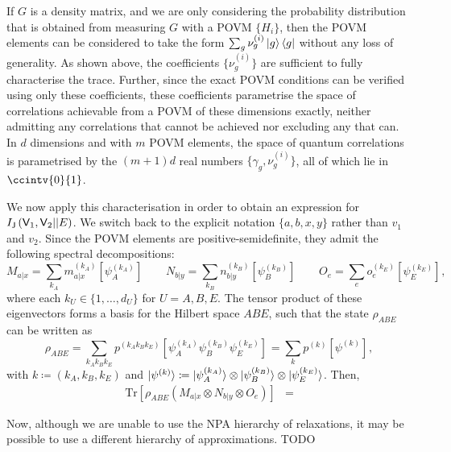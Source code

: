 \documentclass[10pt, a4paper]{article}
\numberwithin{equation}{section} %
\theoremstyle{definition}
\theoremstyle{plain}
\newcommand{\dintv}[2]{\mathopen\{#1,\ldots,#2\mathclose\}}
\newcommand{\?}{\mathrel{?}} %
\newcommand{\Tr}{\mathrm{Tr}} %
\newcommand{\crv}[1]{\mathsf{#1}}
\newcommand{\proj}[2][]{{[#2]}_{#1}}
\begin{document}
    If \(G\) is a density matrix, and we are only considering the probability distribution that is obtained from measuring \(G\) with a POVM \(\{H_i\}\), then the POVM elements can be considered to take the form \(\sum_g \nu_g^{(i)} \ket{g}\bra{g} \) without any loss of generality. As shown above, the coefficients \(\{\nu_g^{(i)}\}\) are sufficient to fully characterise the trace. Further, since the exact POVM conditions can be verified using only these coefficients, these coefficients parametrise the space of correlations achievable from a POVM of these dimensions exactly, neither admitting any correlations that cannot be achieved nor excluding any that can. In \(d\) dimensions and with \(m\) POVM elements, the space of quantum correlations is parametrised by the \((m+1)d\) real numbers \(\{\gamma_g, \nu^{(i)}_g\}\), all of which lie in \(\ccintv{0}{1}\).

    We now apply this characterisation in order to obtain an expression for \(\splitkey{\crv{V}_1, \crv{V}_2}{E}\). We switch back to the explicit notation \(\{a, b, x, y\}\) rather than \(v_1\) and \(v_2\). Since the POVM elements are positive-semidefinite, they admit the following spectral decompositions:
    \begin{equation}
      M_{a|x} = \sum_{k_A} m_{a|x}^{(k_A)} \proj{\psi_A^{(k_A)}} \qquad N_{b|y} = \sum_{k_B} n_{b|y}^{(k_B)} \proj{\psi_B^{(k_B)}} \qquad O_{e} = \sum_{e} o_{e}^{(k_E)} \proj{\psi_E^{(k_E)}},
    \end{equation}
    where each \(k_U \in \dintv{1}{d_U}\) for \(U = A,B,E\). 
    The tensor product of these eigenvectors forms a basis for the Hilbert space \(ABE\), such that the state \(\rho_{ABE}\) can be written as
    \begin{equation}
      \rho_{ABE} = \sum_{k_A k_B k_E} p^{(k_A k_B k_E)} \proj{\psi_A^{(k_A)} \psi_B^{(k_B)} \psi_E^{(k_E)}} = \sum_{k} p^{(k)} \proj{\psi^{(k)}},
    \end{equation}
    with \(k \coloneqq (k_A, k_B, k_E)\) and \(\ket{\psi^{(k)}} \coloneqq \ket{\psi_A^{(k_A)}} \otimes \ket{\psi_B^{(k_B)}} \otimes \ket{\psi_E^{(k_E)}}\). Then,
    \begin{align}
      \Tr\left[\rho_{ABE} \left(M_{a|x} \otimes N_{b|y} \otimes O_e\right)\right] &= 
    \end{align}

    Now, although we are unable to use the NPA hierarchy of relaxations, it may be possible to use a different hierarchy of approximations. TODO
\end{document}
